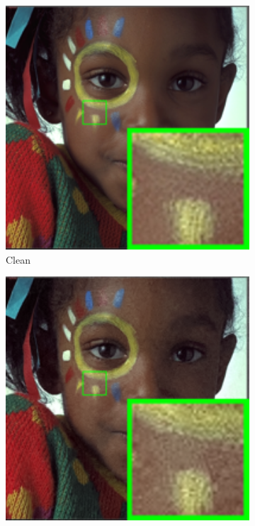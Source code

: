 \begin{figure}
\begin{subfigure}[t]{0.19\textwidth}
        \includegraphics[width=1\textwidth]{images/mcwnnm/24images/resize_br_kodim15.png}
		\caption{Clean}
    \end{subfigure}
    \hfill
    \begin{subfigure}[t]{0.19\textwidth}
        \centering
        \includegraphics[width=1\textwidth]{images/mcwnnm/24images/resize_br_CBM3D_nSig53015_kodim15.png}

\end{subfigure}
\end{figure}
